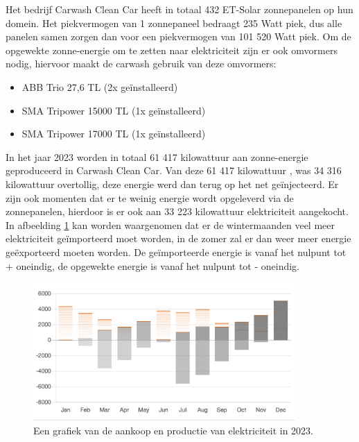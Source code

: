 Het bedrijf Carwash Clean Car heeft in totaal 432 ET-Solar zonnepanelen op hun domein. Het piekvermogen van 1 zonnepaneel bedraagt 235 Watt piek, dus alle panelen samen zorgen dan voor een piekvermogen van 101 520 Watt piek. Om de opgewekte zonne-energie om te zetten naar elektriciteit zijn er ook omvormers nodig, hiervoor maakt de carwash gebruik van deze omvormers:

\begin{itemize}
    \item ABB Trio 27,6 TL (2x geïnstalleerd)
    \item SMA Tripower 15000 TL (1x geïnstalleerd)
    \item SMA Tripower 17000 TL (1x geïnstalleerd)
\end{itemize}

In het jaar 2023 worden in totaal 61 417 kilowattuur aan zonne-energie geproduceerd in Carwash Clean Car. Van deze 61 417 kilowattuur , was 34 316 kilowattuur overtollig, deze energie werd dan terug op het net geïnjecteerd. Er zijn ook momenten dat er te weinig energie wordt opgeleverd via de zonnepanelen, hierdoor is er ook aan 33 223 kilowattuur elektriciteit aangekocht. In afbeelding \ref{fig:energie-productie-2023} kan worden waargenomen dat er de wintermaanden veel meer elektriciteit geïmporteerd moet worden, in de zomer zal er dan weer meer energie geëxporteerd moeten worden. De geïmporteerde energie is vanaf het nulpunt tot + oneindig, de opgewekte energie is vanaf het nulpunt tot - oneindig.

\begin{figure}[h]
    \includegraphics[width=10cm]{./graphics/Energie-opbrengsten-2023}
    \caption{Een grafiek van de aankoop en productie van elektriciteit in 2023.}
    \label{fig:energie-productie-2023}
\end{figure}

